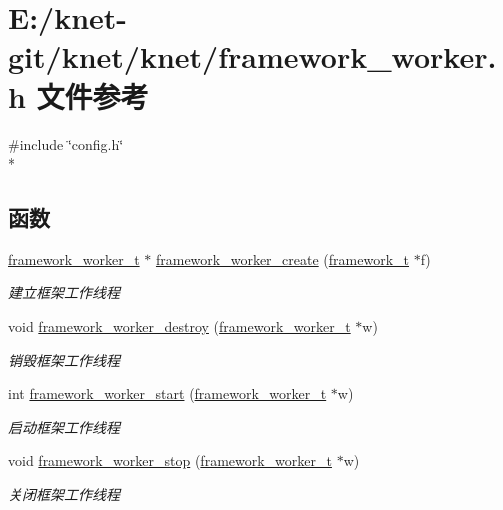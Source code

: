 \hypertarget{a00054}{}\section{E\+:/knet-\/git/knet/knet/framework\+\_\+worker.h 文件参考}
\label{a00054}
{\ttfamily \#include \char`\"{}config.\+h\char`\"{}}\\*
\subsection*{函数}
\begin{DoxyCompactItemize}
\item 
\hyperlink{a00047_aeb7a44e6b579659a8aae81f3ab819af3_aeb7a44e6b579659a8aae81f3ab819af3}{framework\+\_\+worker\+\_\+t} $\ast$ \hyperlink{a00054_a0617a9e873aa183a3bb0cc33a542a8a1_a0617a9e873aa183a3bb0cc33a542a8a1}{framework\+\_\+worker\+\_\+create} (\hyperlink{a00047_a6149d769f6f07ed14a40a271c95d8463_a6149d769f6f07ed14a40a271c95d8463}{framework\+\_\+t} $\ast$f)
\begin{DoxyCompactList}\small\item\em 建立框架工作线程 \end{DoxyCompactList}\item 
void \hyperlink{a00054_a1f5d04499db3c8137c840c8c87cdba5e_a1f5d04499db3c8137c840c8c87cdba5e}{framework\+\_\+worker\+\_\+destroy} (\hyperlink{a00047_aeb7a44e6b579659a8aae81f3ab819af3_aeb7a44e6b579659a8aae81f3ab819af3}{framework\+\_\+worker\+\_\+t} $\ast$w)
\begin{DoxyCompactList}\small\item\em 销毁框架工作线程 \end{DoxyCompactList}\item 
int \hyperlink{a00054_a8030b85e272bfe80459bbecbca5cd9c0_a8030b85e272bfe80459bbecbca5cd9c0}{framework\+\_\+worker\+\_\+start} (\hyperlink{a00047_aeb7a44e6b579659a8aae81f3ab819af3_aeb7a44e6b579659a8aae81f3ab819af3}{framework\+\_\+worker\+\_\+t} $\ast$w)
\begin{DoxyCompactList}\small\item\em 启动框架工作线程 \end{DoxyCompactList}\item 
void \hyperlink{a00054_a52ecf94ed22881622a06600042ab1bb1_a52ecf94ed22881622a06600042ab1bb1}{framework\+\_\+worker\+\_\+stop} (\hyperlink{a00047_aeb7a44e6b579659a8aae81f3ab819af3_aeb7a44e6b579659a8aae81f3ab819af3}{framework\+\_\+worker\+\_\+t} $\ast$w)
\begin{DoxyCompactList}\small\item\em 关闭框架工作线程 \end{DoxyCompactList}\end{DoxyCompactItemize}


